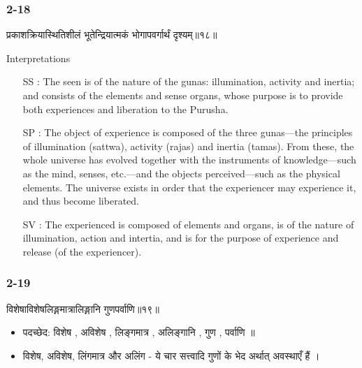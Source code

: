 \begin{frame}[fragile]\frametitle{2-18}
\begin{sanskrit}
प्रकाशक्रियास्थितिशीलं भूतेन्द्रियात्मकं भोगापवर्गार्थं दृश्यम्॥१८॥
\end{sanskrit}

Interpretations
\begin{itemize}
\item [SS]: The seen is of the nature of the gunas: illumination, activity and inertia; and consists of the elements and sense organs, whose purpose is to provide both experiences and liberation to the Purusha.
\item [SP]: The object of experience is composed of the three gunas—the principles of illumination (sattwa), activity (rajas) and inertia (tamas). From these, the whole universe has evolved together with the instruments of knowledge—such as the mind, senses, etc.—and the objects perceived—such as the physical elements. The universe exists in order that the experiencer may experience it, and thus become liberated.
\item [SV]: The experienced is composed of elements and organs, is of the nature of illumination, action and intertia, and is for the purpose of experience and release (of the experiencer).
\end{itemize}
\end{frame}

\begin{frame}[fragile]\frametitle{2-19}
\begin{sanskrit}
विशेषाविशेषलिङ्गमात्रालिङ्गानि गुणपर्वाणि॥१९॥
\end{sanskrit}

\begin{itemize}
\item पदच्छेद: विशेष , अविशेष , लिङ्गमात्र , अलिङ्गानि , गुण , पर्वाणि ॥
\item विशेष, अविशेष, लिंगमात्र और अलिंग - ये चार सत्त्वादि गुणों के भेद अर्थात् अवस्थाएँ हैं ।
\end{itemize}
	
\end{frame}

